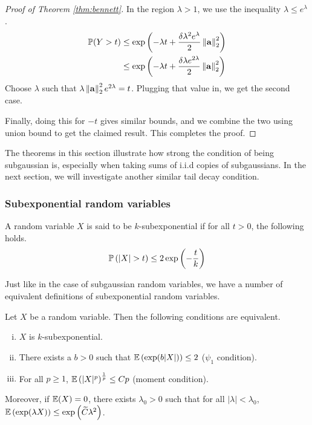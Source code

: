 \documentclass[11pt]{article}
\begin{document}
\begin{proof}[Proof of Theorem \ref{thm:bennett}]
  In the region $\lambda > 1$, we use the inequality $\lambda \leq e^{\lambda}$.
  \begin{align*}
    \P(Y > t) &\leq \exp\left( -\lambda t + \frac{\delta\lambda^2 e^{\lambda}}{2} \norm{\mathbf{a}}_2^2 \right) \\
              &\leq \exp\left( -\lambda t + \frac{\delta\lambda e^{2\lambda}}{2} \norm{\mathbf{a}}_2^2 \right)
  \end{align*}
  Choose $\lambda$ such that $\lambda \norm{\mathbf{a}}_2^2 e^{2\lambda} = t$. Plugging that value in, we get the second case.

  Finally, doing this for $-t$ gives similar bounds, and we combine the two using union bound to get the claimed result. This completes the proof.
\end{proof}

The theorems in this section illustrate how strong the condition of being subgaussian is, especially when taking sums of i.i.d copies of subgaussians.
In the next section, we will investigate another similar tail decay condition.

\subsubsection{Subexponential random variables}
\label{sec:subexp-rand-vari}

\begin{definition}
  A random variable $X$ is said to be $k$-subexponential if for all $t > 0$, the following holds.
  \begin{align*}
    \P\left( |X| > t \right) \leq 2 \exp\left(- \frac{t}{k} \right)
  \end{align*}
\end{definition}

Just like in the case of subgaussian random variables, we have a number of equivalent definitions of subexponential random variables.

\begin{lemma}
  Let $X$ be a random variable. Then the following conditions are equivalent.
  \begin{enumerate}[(i)]
  \item $X$ is $k$-subexponential.
  \item There exists a $b > 0$ such that $\E\left( \exp(b|X|) \right) \leq 2$ ($\psi_1$ condition).
  \item For all $p \geq 1$, $\E\left( |X|^p \right)^{\frac{1}{p}} \leq Cp$ (moment condition).
  \end{enumerate}
  Moreover, if $\E(X) = 0$, there exists $\lambda_0 > 0 $ such that for all $|\lambda| < \lambda_0$, $\E \left( \exp(\lambda X) \right) \leq \exp\left( \widetilde{C}\lambda^2 \right)$.
\end{lemma}
\end{document}
